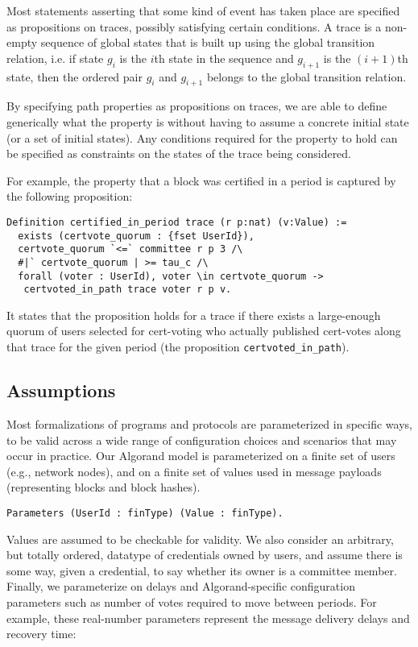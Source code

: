 Most statements asserting that some kind of event has taken place are specified as propositions on traces, possibly satisfying certain conditions. A trace is a non-empty sequence of global states that is built up using the global transition relation, i.e. if state $g_i$ is the $i$th state in the sequence and $g_{i+1}$ is the $(i+1)$th state, then the ordered pair $g_i$ and $g_{i+1}$ belongs to the global transition relation. 

By specifying path properties as propositions on traces, we are able to define generically what the property is without having to assume a concrete initial state (or a set of initial states). Any conditions required for the property to hold can be specified as constraints on the states of the trace being considered.

For example, the property that a block was certified in a period is captured by the following proposition:
\begin{lstlisting}[language=Coq]
Definition certified_in_period trace (r p:nat) (v:Value) :=
  exists (certvote_quorum : {fset UserId}),
  certvote_quorum `<=` committee r p 3 /\
  #|` certvote_quorum | >= tau_c /\
  forall (voter : UserId), voter \in certvote_quorum ->
   certvoted_in_path trace voter r p v.
\end{lstlisting}
It states that the proposition holds for a trace if there exists a large-enough quorum of users selected for cert-voting who actually published cert-votes along that trace for the given period (the proposition \lstinline{certvoted_in_path}).

\subsection{Assumptions}

Most formalizations of programs and protocols are parameterized in specific ways, to be valid across a wide range of configuration choices and scenarios that may occur in practice. Our Algorand model is parameterized on a finite set of users (e.g., network nodes), and on a finite set of values used in message payloads (representing blocks and block hashes). 

\begin{lstlisting}[language=Coq]
Parameters (UserId : finType) (Value : finType).
\end{lstlisting}

Values are assumed to be checkable for validity. We also consider an arbitrary, but totally ordered, datatype of credentials owned by users, and assume there is some way, given a credential, to say whether its owner is a committee member. Finally, we parameterize on delays and Algorand-specific configuration parameters such as number of votes required to move between periods. For example, these real-number parameters represent the message delivery delays and recovery time:

